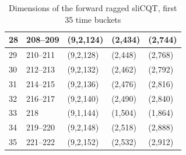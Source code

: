 \documentclass[report.tex]{subfiles}
\begin{document}
\begin{table}[ht]
\begin{tabular}{ |l|l|l|l|l| }
\hline
28 & 208--209 & (9,2,124) & (2,434) & (2,744) \\
\hline
29 & 210--211 & (9,2,128) & (2,448) & (2,768) \\
\hline
30 & 212--213 & (9,2,132) & (2,462) & (2,792) \\
\hline
31 & 214--215 & (9,2,136) & (2,476) & (2,816) \\
\hline
32 & 216--217 & (9,2,140) & (2,490) & (2,840) \\
\hline
33 & 218 & (9,1,144) & (1,504) & (1,864) \\
\hline
34 & 219--220 & (9,2,148) & (2,518) & (2,888) \\
\hline
35 & 221--222 & (9,2,152) & (2,532) & (2,912) \\
\hline
\end{tabular}
	\caption{Dimensions of the forward ragged sliCQT, first 35 time buckets}
	\label{table:slicqdim1}
\end{table}
\end{document}

